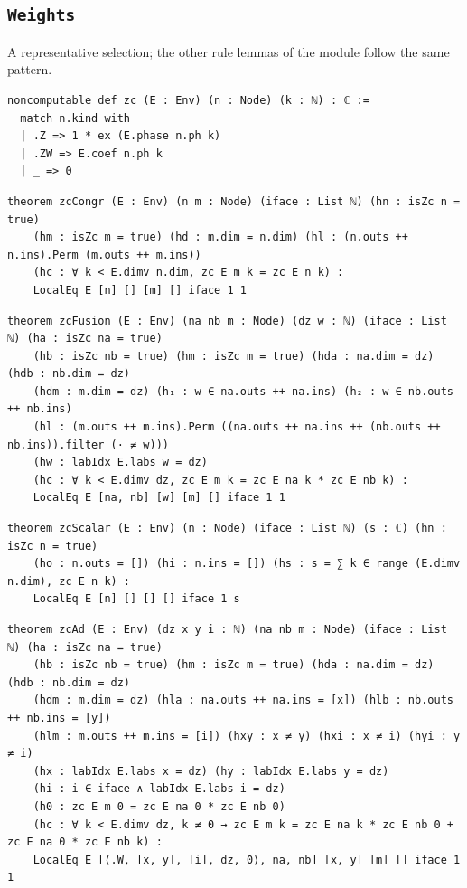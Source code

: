 \subsection{\texttt{Weights}}
A representative selection; the other rule lemmas of the module follow the same pattern.
\begin{lstlisting}[style=leancore]
noncomputable def zc (E : Env) (n : Node) (k : ℕ) : ℂ :=
  match n.kind with
  | .Z => 1 * ex (E.phase n.ph k)
  | .ZW => E.coef n.ph k
  | _ => 0
\end{lstlisting}
\begin{lstlisting}[style=leancore]
theorem zcCongr (E : Env) (n m : Node) (iface : List ℕ) (hn : isZc n = true)
    (hm : isZc m = true) (hd : m.dim = n.dim) (hl : (n.outs ++ n.ins).Perm (m.outs ++ m.ins))
    (hc : ∀ k < E.dimv n.dim, zc E m k = zc E n k) :
    LocalEq E [n] [] [m] [] iface 1 1
\end{lstlisting}
\begin{lstlisting}[style=leancore]
theorem zcFusion (E : Env) (na nb m : Node) (dz w : ℕ) (iface : List ℕ) (ha : isZc na = true)
    (hb : isZc nb = true) (hm : isZc m = true) (hda : na.dim = dz) (hdb : nb.dim = dz)
    (hdm : m.dim = dz) (h₁ : w ∈ na.outs ++ na.ins) (h₂ : w ∈ nb.outs ++ nb.ins)
    (hl : (m.outs ++ m.ins).Perm ((na.outs ++ na.ins ++ (nb.outs ++ nb.ins)).filter (· ≠ w)))
    (hw : labIdx E.labs w = dz)
    (hc : ∀ k < E.dimv dz, zc E m k = zc E na k * zc E nb k) :
    LocalEq E [na, nb] [w] [m] [] iface 1 1
\end{lstlisting}
\begin{lstlisting}[style=leancore]
theorem zcScalar (E : Env) (n : Node) (iface : List ℕ) (s : ℂ) (hn : isZc n = true)
    (ho : n.outs = []) (hi : n.ins = []) (hs : s = ∑ k ∈ range (E.dimv n.dim), zc E n k) :
    LocalEq E [n] [] [] [] iface 1 s
\end{lstlisting}
\begin{lstlisting}[style=leancore]
theorem zcAd (E : Env) (dz x y i : ℕ) (na nb m : Node) (iface : List ℕ) (ha : isZc na = true)
    (hb : isZc nb = true) (hm : isZc m = true) (hda : na.dim = dz) (hdb : nb.dim = dz)
    (hdm : m.dim = dz) (hla : na.outs ++ na.ins = [x]) (hlb : nb.outs ++ nb.ins = [y])
    (hlm : m.outs ++ m.ins = [i]) (hxy : x ≠ y) (hxi : x ≠ i) (hyi : y ≠ i)
    (hx : labIdx E.labs x = dz) (hy : labIdx E.labs y = dz)
    (hi : i ∈ iface ∧ labIdx E.labs i = dz)
    (h0 : zc E m 0 = zc E na 0 * zc E nb 0)
    (hc : ∀ k < E.dimv dz, k ≠ 0 → zc E m k = zc E na k * zc E nb 0 + zc E na 0 * zc E nb k) :
    LocalEq E [⟨.W, [x, y], [i], dz, 0⟩, na, nb] [x, y] [m] [] iface 1 1
\end{lstlisting}
